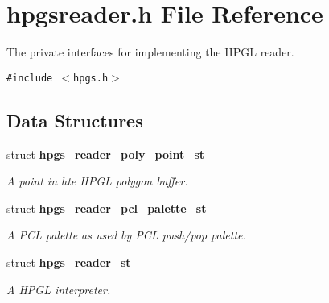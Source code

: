 \section{hpgsreader.h File Reference}
\label{hpgsreader_8h}
The private interfaces for implementing the HPGL reader. 

{\tt \#include $<$hpgs.h$>$}\par
\subsection*{Data Structures}
\begin{CompactItemize}
\item 
struct {\bf hpgs\_\-reader\_\-poly\_\-point\_\-st}
\begin{CompactList}\small\item\em A point in hte HPGL polygon buffer. \item\end{CompactList}\item 
struct {\bf hpgs\_\-reader\_\-pcl\_\-palette\_\-st}
\begin{CompactList}\small\item\em A PCL palette as used by PCL push/pop palette. \item\end{CompactList}\item 
struct {\bf hpgs\_\-reader\_\-st}
\begin{CompactList}\small\item\em A HPGL interpreter. \item\end{CompactList}\end{CompactItemize}
